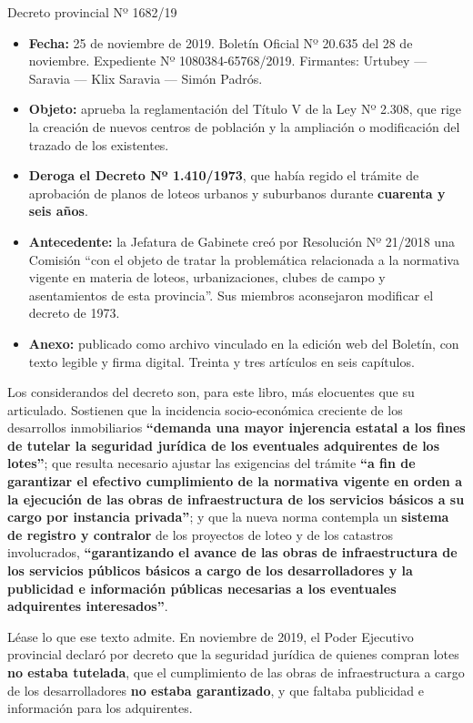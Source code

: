 \begin{ficha}{Decreto provincial Nº 1682/19}
\begin{itemize}[leftmargin=*,nosep]
\item \textbf{Fecha:} 25 de noviembre de 2019. Boletín Oficial Nº 20.635 del 28 de noviembre. Expediente Nº 1080384-65768/2019. Firmantes: Urtubey --- Saravia --- Klix Saravia --- Simón Padrós.
\item \textbf{Objeto:} aprueba la reglamentación del Título V de la Ley Nº 2.308, que rige la creación de nuevos centros de población y la ampliación o modificación del trazado de los existentes.
\item \textbf{Deroga el Decreto Nº 1.410/1973}, que había regido el trámite de aprobación de planos de loteos urbanos y suburbanos durante \textbf{cuarenta y seis años}.
\item \textbf{Antecedente:} la Jefatura de Gabinete creó por Resolución Nº 21/2018 una Comisión ``con el objeto de tratar la problemática relacionada a la normativa vigente en materia de loteos, urbanizaciones, clubes de campo y asentamientos de esta provincia''. Sus miembros aconsejaron modificar el decreto de 1973.
\item \textbf{Anexo:} publicado como archivo vinculado en la edición web del Boletín, con texto legible y firma digital. Treinta y tres artículos en seis capítulos.
\end{itemize}
\end{ficha}

Los considerandos del decreto son, para este libro, más elocuentes que su articulado. Sostienen que la incidencia socio-económica creciente de los desarrollos inmobiliarios \textbf{``demanda una mayor injerencia estatal a los fines de tutelar la seguridad jurídica de los eventuales adquirentes de los lotes''}; que resulta necesario ajustar las exigencias del trámite \textbf{``a fin de garantizar el efectivo cumplimiento de la normativa vigente en orden a la ejecución de las obras de infraestructura de los servicios básicos a su cargo por instancia privada''}; y que la nueva norma contempla un \textbf{sistema de registro y contralor} de los proyectos de loteo y de los catastros involucrados, \textbf{``garantizando el avance de las obras de infraestructura de los servicios públicos básicos a cargo de los desarrolladores y la publicidad e información públicas necesarias a los eventuales adquirentes interesados''}.

Léase lo que ese texto admite. En noviembre de 2019, el Poder Ejecutivo provincial declaró por decreto que la seguridad jurídica de quienes compran lotes \textbf{no estaba tutelada}, que el cumplimiento de las obras de infraestructura a cargo de los desarrolladores \textbf{no estaba garantizado}, y que faltaba publicidad e información para los adquirentes.

